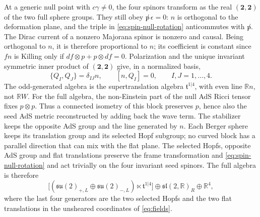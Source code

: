 At a generic null point with $c\gamma\ne0$, the four spinors transform as
the real $(\mathbf 2,\mathbf 2)$ of the two full sphere groups. They still
obey $\not p\,\epsilon=0$: $n$ is orthogonal to the deformation plane,
and the triple in \eqref{eq:spin-null-rotation} anticommutes with
$\not p$. The Dirac current of a nonzero Majorana spinor is nonzero and
causal. Being orthogonal to $n$, it is therefore proportional to $n$;
its coefficient is constant since $fn$ is Killing only if
$df\otimes p+p\otimes df=0$. Polarization and the unique invariant
symmetric inner product of $(\mathbf 2,\mathbf 2)$ give, in a normalized
basis,
\[
 \{Q_I,Q_J\}=\delta_{IJ} n,\qquad [n,Q_I]=0,\qquad I,J=1,\ldots,4 .
\]
The odd-generated algebra is the supertranslation algebra
$\mathfrak t^{1|4}$, with even line $\mathbb R n$, not $\mathbb R W$.
For the full algebra, the non-Einstein part of the null AdS Ricci tensor
fixes $p\otimes p$. Thus a connected isometry of this block preserves
$p$, hence also the seed AdS metric reconstructed by adding back the wave
term. The stabilizer keeps the opposite AdS group and the line generated
by $n$. Each Berger sphere keeps its translation group and its selected
Hopf subgroup; no curved block has a parallel direction that can mix
with the flat plane. The selected Hopfs, opposite AdS group and flat
translations preserve the frame transformation and \eqref{eq:spin-null-rotation}
and act trivially on the four invariant seed spinors. The full algebra is
therefore
\begin{equation}\label{eq:spin-null-algebra}
 \big[(\mathfrak{su}(2)_{+,L}\oplus\mathfrak{su}(2)_{-,L})
       \ltimes\mathfrak t^{1|4}\big]
 \oplus\mathfrak{sl}(2,\mathbb R)_R\oplus\mathbb R^4 ,
\end{equation}
where the last four generators are the two selected Hopfs and the two flat
translations in the unsheared coordinates of \eqref{eq:fields}.
